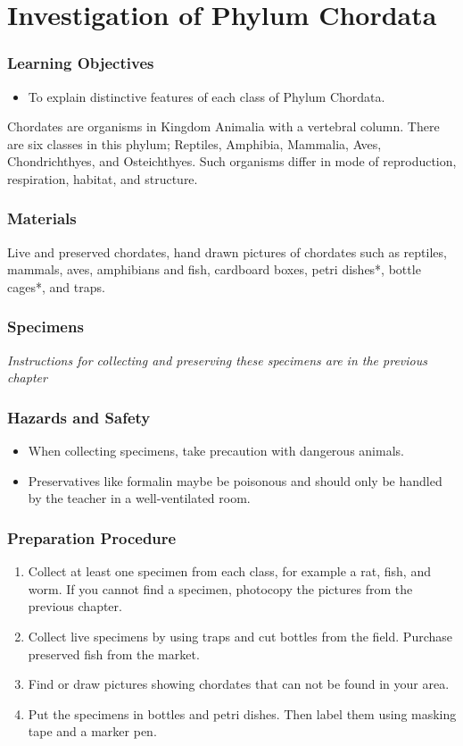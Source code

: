 \section{Investigation of Phylum Chordata}

\subsubsection*{Learning Objectives}
\begin{itemize}
\item{To explain distinctive features of each class of Phylum Chordata.}
\end{itemize}


Chordates are organisms in Kingdom Animalia with a vertebral column. There are six classes in this phylum; Reptiles, Amphibia, Mammalia, Aves, Chondrichthyes, and Osteichthyes. Such organisms differ in mode of reproduction, respiration, habitat, and structure.

\subsubsection*{Materials}
Live and preserved chordates, hand drawn pictures of chordates such as reptiles, mammals, aves, amphibians and fish, cardboard boxes, petri dishes*, bottle cages*, and traps.

\subsubsection*{Specimens}
\textit{Instructions for collecting and preserving these specimens are in the previous chapter}


\subsubsection*{Hazards and Safety}
\begin{itemize}
\item{When collecting specimens, take precaution with dangerous animals.}
\item{Preservatives like formalin maybe be poisonous and should only be handled by the teacher in a well-ventilated room.}
\end{itemize}

\subsubsection*{Preparation Procedure}
\begin{enumerate}
\item{Collect at least one specimen from each class, for example a rat, fish, and worm. If you cannot find a specimen, photocopy the pictures from the previous chapter.}
\item{Collect live specimens by using traps and cut bottles from the field. Purchase preserved fish from the market.}
\item{Find or draw pictures showing chordates that can not be found in your area.}
\item{Put the specimens in bottles and petri dishes. Then label them using masking tape and a marker pen.}
\end{enumerate}

